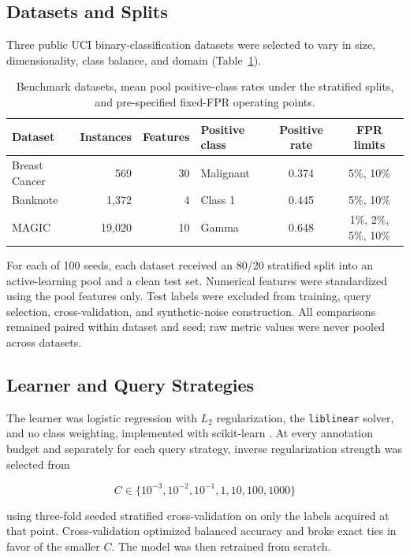 \documentclass[11pt]{article}
\begin{document}
\subsection{Datasets and Splits}

Three public UCI binary-classification datasets were selected to vary in size,
dimensionality, class balance, and domain (Table~\ref{tab:datasets}).

\begin{table}[ht]
\centering
\small
\begin{tabular}{lrrlcc}
\toprule
Dataset & Instances & Features & Positive class & Positive rate & FPR limits \\
\midrule
Breast Cancer \citep{wolberg1993} & 569 & 30 & Malignant & 0.374 & 5\%, 10\% \\
Banknote \citep{lohweg2012} & 1,372 & 4 & Class 1 & 0.445 & 5\%, 10\% \\
MAGIC \citep{bock2004} & 19,020 & 10 & Gamma & 0.648 & 1\%, 2\%, 5\%, 10\% \\
\bottomrule
\end{tabular}
\caption{Benchmark datasets, mean pool positive-class rates under the
stratified splits, and pre-specified fixed-FPR operating points.}
\label{tab:datasets}
\end{table}

For each of 100 seeds, each dataset received an 80/20 stratified split into an
active-learning pool and a clean test set. Numerical features were
standardized using the pool features only. Test labels were excluded from
training, query selection, cross-validation, and synthetic-noise construction.
All comparisons remained paired within dataset and seed; raw metric values
were never pooled across datasets.

\subsection{Learner and Query Strategies}

The learner was logistic regression with $L_2$ regularization, the
\texttt{liblinear} solver, and no class weighting, implemented with
scikit-learn \citep{pedregosa2011}. At every annotation budget and separately
for each query strategy, inverse regularization strength was selected from

\[
C\in\{10^{-3},10^{-2},10^{-1},1,10,100,1000\}
\]

using three-fold seeded stratified cross-validation on only the labels
acquired at that point. Cross-validation optimized balanced accuracy and
broke exact ties in favor of the smaller $C$. The model was then retrained
from scratch.
\end{document}
